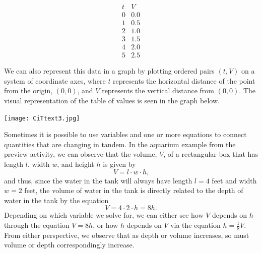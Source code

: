 \documentclass{ximera}
\begin{document}
$$
\begin{array}{cc}
t&V\\
\hline
0&0.0\\
1&0.5\\
2&1.0\\
3&1.5\\
4&2.0\\
5&2.5
\end{array}
$$



We can also represent this data in a graph by plotting ordered pairs $(t,V)$ on a system of coordinate axes, where $t$ represents the horizontal distance of the point from the origin, $(0,0)$, and $V$ represents the vertical distance from $(0,0)$.  The visual representation of the table of values is seen in the graph below.%

\begin{image}
\texttt{[image: CiTtext3.jpg]}
\end{image}


Sometimes it is possible to use variables and one or more equations to connect quantities that are changing in tandem.  In the aquarium example from the preview activity, we can observe that the volume, $V$, of a rectangular box that has length $l$, width $w$, and height $h$ is given by%
\begin{equation*}
V = l \cdot w \cdot h\text{,}
\end{equation*}
and thus, since the water in the tank will always have length $l = 4$ feet and width $w = 2$ feet, the volume of water in the tank is directly related to the depth of water in the tank by the equation%
\begin{equation*}
V = 4 \cdot 2 \cdot h = 8h\text{.}
\end{equation*}
Depending on which variable we solve for, we can either see how $V$ depends on $h$ through the equation $V = 8h$, or how $h$ depends on $V$ via the equation $h = \frac{1}{8}V$.  From either perspective, we observe that as depth or volume increases, so must volume or depth correspondingly increase.%
\end{document}
